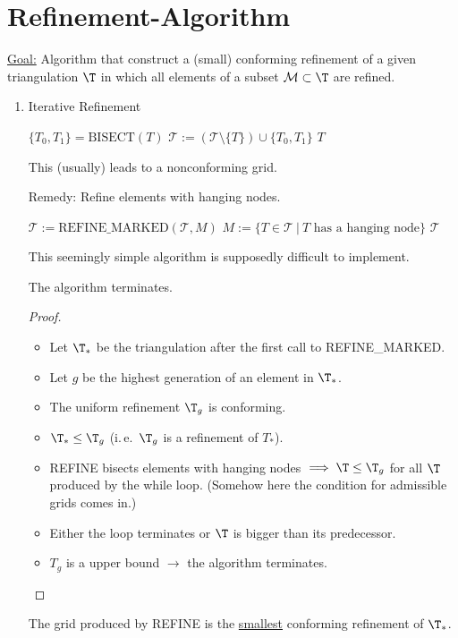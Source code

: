 \section{Refinement-Algorithm}
\underline{Goal:} Algorithm that construct a (small) conforming refinement of a given triangulation $\T$ in which all elements of a subset $\mathcal{M} \subset \T$ are refined.
\begin{enumerate}[label = \alph*)]
	\item Iterative Refinement
    \begin{algorithmic}[0]
        \State $\{T_0, T_1\} = \text{BISECT} (T)$
          \State $\mathcal{T} := (\mathcal{T} \setminus \{T\}) \cup \{T_0, T_1\}$
        \EndFor
        \State \Return $T$
      \EndFunction
    \end{algorithmic}
    This (usually) leads to a nonconforming grid.

		Remedy: Refine elements with hanging nodes.
    \begin{algorithmic}[0]
          \State $\mathcal{T} := \text{REFINE\_MARKED}(\mathcal{T}, M)$
          \State $M := \{T \in \mathcal{T} \ |\ T \text{ has a hanging node}\}$
        \EndWhile
        \State \Return $\mathcal{T}$
      \EndFunction
    \end{algorithmic}
    This seemingly simple algorithm is supposedly difficult to implement.
		\begin{lemma}
			The algorithm terminates.
    \end{lemma}
    \begin{proof}\
			\begin{itemize}
				\item Let $\T_{*}$ be the triangulation after the first call to REFINE\_MARKED.
				\item Let $g$ be the highest generation of an element in $\T_{*}$. 
				\item The uniform refinement $\T_{g}$ is conforming.
				\item $\T_{*}\leq \T_{g}$ (i.\,e.\ $\T_{g}$ is a refinement of $T_{*}$).
        \item REFINE bisects elements with hanging nodes $\implies \T \leq \T_{g}$ for all $\T$ produced by the \glqq while\grqq{} loop. (Somehow here the condition for admissible grids comes in.)
				\item Either the loop terminates or $\T$ is bigger than its predecessor.
				\item $T_{g}$ is a upper bound $\to$ the algorithm terminates.
			\end{itemize}
		\end{proof}
		\begin{lemma}
			The grid produced by REFINE
			is the \underline{smallest} conforming refinement of $\T_{*}$.
		\end{lemma}

\end{enumerate}
